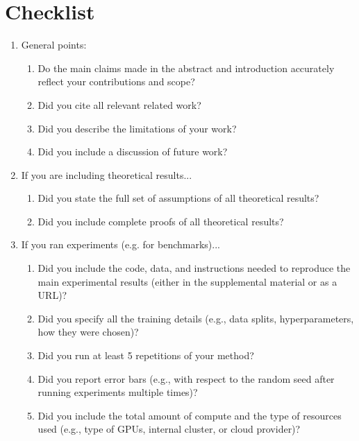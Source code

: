 \documentclass{article}
\begin{document}
\section*{Checklist}
\begin{enumerate}

\item General points:
\begin{enumerate}
  \item Do the main claims made in the abstract and introduction accurately reflect your contributions and scope?
    \answerTODO{}
  \item Did you cite all relevant related work?
    \answerTODO{}
  \item Did you describe the limitations of your work?
    \answerTODO{}
  \item Did you include a discussion of future work?
    \answerTODO{}
\end{enumerate}

\item If you are including theoretical results...
\begin{enumerate}
  \item Did you state the full set of assumptions of all theoretical results?
    \answerTODO{}
	\item Did you include complete proofs of all theoretical results?
    \answerTODO{}
\end{enumerate}

\item If you ran experiments (e.g. for benchmarks)...
\begin{enumerate}
  \item Did you include the code, data, and instructions needed to reproduce the main experimental results (either in the supplemental material or as a URL)?
    \answerTODO{}
  \item Did you specify all the training details (e.g., data splits, hyperparameters, how they were chosen)?
    \answerTODO{}
  \item Did you run at least 5 repetitions of your method?
    \answerTODO{}
  \item Did you report error bars (e.g., with respect to the random seed after running experiments multiple times)?
    \answerTODO{}
  \item Did you include the total amount of compute and the type of resources used (e.g., type of GPUs, internal cluster, or cloud provider)?
    \answerTODO{}
\end{enumerate}


\end{enumerate}
\end{document}
